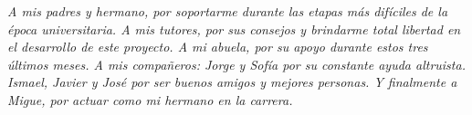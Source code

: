 


\textit{A mis padres y hermano, por soportarme durante las etapas más difíciles de la época universitaria. A mis tutores, por sus consejos y brindarme total libertad en el desarrollo de este proyecto. A mi abuela, por su apoyo durante estos tres últimos meses. A mis compañeros: Jorge y Sofía por su constante ayuda altruista. Ismael, Javier y José por ser buenos amigos y mejores personas. Y finalmente a Migue, por actuar como mi hermano en la carrera.}

\restoregeometry